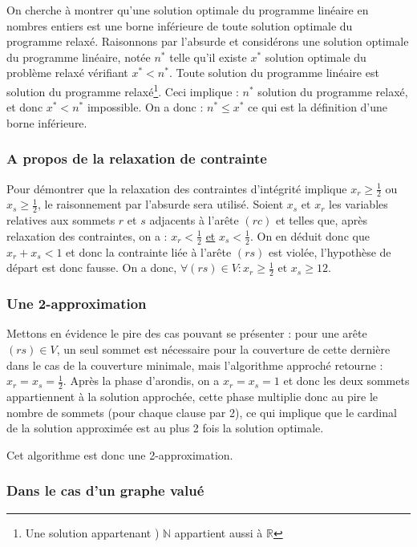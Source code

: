 On cherche à montrer qu'une solution optimale du programme linéaire en nombres entiers est une borne
inférieure de toute solution optimale du programme relaxé. Raisonnons par l'absurde et considérons
une solution optimale du programme linéaire, notée $n^*$ telle qu'il existe $x^*$ solution optimale du problème
relaxé vérifiant $x^* < n^*$. Toute solution du programme linéaire est solution du programme
relaxé\footnote{Une solution appartenant ) $\mathbb{N}$ appartient aussi à $\mathbb{R}$}. Ceci
implique : $n^*$ solution du programme relaxé, et donc $x^* < n^*$ impossible. On a donc : $n^* \leq
x^*$ ce qui est la définition d'une borne inférieure.

\subsubsection{A propos de la relaxation de contrainte}

Pour démontrer que la relaxation des contraintes d'intégrité implique $x_r \geq \frac{1}{2}$ ou $x_s
\geq \frac{1}{2}$, le raisonnement par l'absurde sera utilisé. 
Soient $x_s$ et $x_r$ les variables relatives aux sommets $r$ et $s$ adjacents à l'arête $(rc)$ et
telles que, après relaxation des contraintes, on a : $x_r < \frac{1}{2}$ \underline{et} $x_s <
\frac{1}{2}$. On en déduit donc que $x_r + x_s < 1$ et donc la contrainte liée à l'arête $(rs)$ est
violée, l'hypothèse de départ est donc fausse. On a donc, $\forall (rs) \in V : x_r \geq \frac{1}{2}
\mbox{ et } x_s \geq{1}{2}$.

\subsubsection{Une 2-approximation}

Mettons en évidence le pire des cas pouvant se présenter : pour une arête $(rs) \in V$, un seul
sommet est nécessaire pour la couverture de cette dernière dans le cas de la couverture minimale,
mais l'algorithme approché retourne : $x_r = x_s = \frac{1}{2}$. Après la phase d'arondis, on a $x_r
= x_s = 1$ et donc les deux sommets appartiennent à la solution approchée, cette phase multiplie
donc au pire le nombre de sommets (pour chaque clause par 2), ce qui implique que le cardinal de la
solution approximée est au plus 2 fois la solution optimale.

Cet algorithme est donc une 2-approximation.

\subsubsection{Dans le cas d'un graphe valué}

